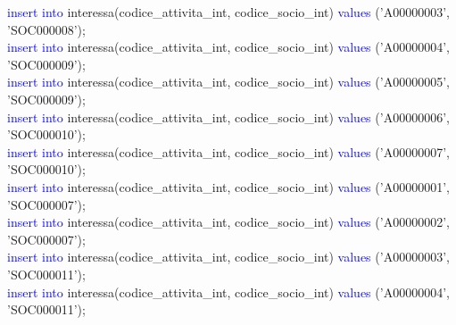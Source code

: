 \documentclass{article}
\begin{document}
\begin{flushleft}
{        \hspace*{0.5em}\textcolor{blue}{insert into} interessa(codice\_attivita\_int, codice\_socio\_int) \textcolor{blue}{values} \hspace*{0.5em}('A00000003', 'SOC000008'); \\
        \hspace*{0.5em}\textcolor{blue}{insert into} interessa(codice\_attivita\_int, codice\_socio\_int) \textcolor{blue}{values} \hspace*{0.5em}('A00000004', 'SOC000009'); \\
        \hspace*{0.5em}\textcolor{blue}{insert into} interessa(codice\_attivita\_int, codice\_socio\_int) \textcolor{blue}{values} \hspace*{0.5em}('A00000005', 'SOC000009'); \\
        \hspace*{0.5em}\textcolor{blue}{insert into} interessa(codice\_attivita\_int, codice\_socio\_int) \textcolor{blue}{values} \hspace*{0.5em}('A00000006', 'SOC000010'); \\
        \hspace*{0.5em}\textcolor{blue}{insert into} interessa(codice\_attivita\_int, codice\_socio\_int) \textcolor{blue}{values} \hspace*{0.5em}('A00000007', 'SOC000010'); \\
        \hspace*{0.5em}\textcolor{blue}{insert into} interessa(codice\_attivita\_int, codice\_socio\_int) \textcolor{blue}{values} \hspace*{0.5em}('A00000001', 'SOC000007'); \\
        \hspace*{0.5em}\textcolor{blue}{insert into} interessa(codice\_attivita\_int, codice\_socio\_int) \textcolor{blue}{values} \hspace*{0.5em}('A00000002', 'SOC000007'); \\
        \hspace*{0.5em}\textcolor{blue}{insert into} interessa(codice\_attivita\_int, codice\_socio\_int) \textcolor{blue}{values} \hspace*{0.5em}('A00000003', 'SOC000011'); \\
        \hspace*{0.5em}\textcolor{blue}{insert into} interessa(codice\_attivita\_int, codice\_socio\_int) \textcolor{blue}{values} \hspace*{0.5em}('A00000004', 'SOC000011'); \\
}
\end{flushleft}
\end{document}
